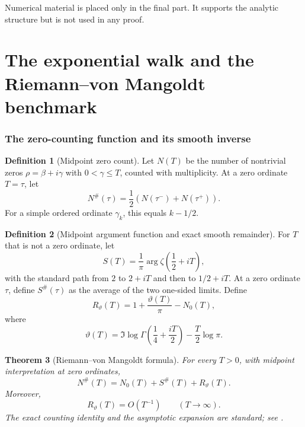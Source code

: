 \documentclass[11pt]{amsart}
\numberwithin{equation}{section}
\theoremstyle{plain}
\newtheorem{theorem}{Theorem}[section]
\theoremstyle{definition}
\newtheorem{definition}[theorem]{Definition}
\theoremstyle{remark}
\newcommand{\1}{\mathbf{1}}
\begin{document}
Numerical material is placed only in the final part.  It supports the
analytic structure but is not used in any proof.

\part{The exponential walk and the Riemann--von Mangoldt benchmark}

\section{The zero-counting function and its smooth inverse}
\label{sec:rvm_counting_inverse}

\begin{definition}[Midpoint zero count]
\label{def:midpoint_zero_count}
Let \(N(T)\) be the number of nontrivial zeros \(\rho=\beta+i\gamma\)
with \(0<\gamma\leq T\), counted with multiplicity.  At a zero ordinate
\(T=\tau\), let
\begin{equation}
N^{\#}(\tau)
=
\frac12\left(N(\tau^-)+N(\tau^+)\right).
\label{eq:midpoint_zero_count}
\end{equation}
For a simple ordered ordinate \(\gamma_k\), this equals \(k-1/2\).
\end{definition}

\begin{definition}[Midpoint argument function and exact smooth remainder]
\label{def:rvm_midpoint_argument_remainder}
For \(T\) that is not a zero ordinate, let
\begin{equation}
S(T)
=
\frac1\pi\arg\zeta\!\left(\frac12+iT\right),
\label{eq:rvm_S_function}
\end{equation}
with the standard path from \(2\) to \(2+iT\) and then to
\(1/2+iT\).  At a zero ordinate \(\tau\), define \(S^{\#}(\tau)\) as the
average of the two one-sided limits.  Define
\begin{equation}
R_\vartheta(T)
=
1+\frac{\vartheta(T)}{\pi}-N_0(T),
\label{eq:rvm_exact_smooth_remainder}
\end{equation}
where
\begin{equation}
\vartheta(T)
=
\Im\log\Gamma\!\left(\frac14+\frac{iT}{2}\right)
-
\frac T2\log\pi.
\label{eq:riemann_siegel_theta}
\end{equation}
\end{definition}

\begin{theorem}[Riemann--von Mangoldt formula]
\label{thm:rvm_formula}
For every \(T>0\), with midpoint interpretation at zero ordinates,
\begin{equation}
\boxed{
N^{\#}(T)
=
N_0(T)+S^{\#}(T)+R_\vartheta(T).
}
\label{eq:rvm_formula}
\end{equation}
Moreover,
\begin{equation}
R_\vartheta(T)=O(T^{-1})
\qquad(T\to\infty).
\label{eq:rvm_remainder}
\end{equation}
The exact counting identity and the asymptotic expansion are standard; see
\cite[Chapter~9]{Titchmarsh1986}.
\end{theorem}
\end{document}

